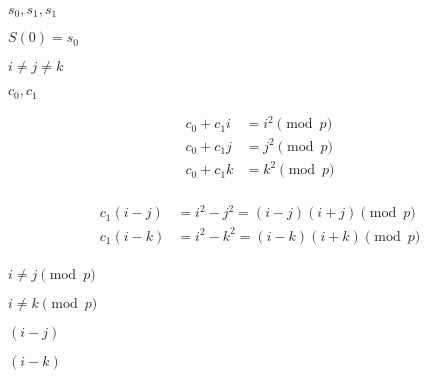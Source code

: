 \documentclass[10pt]{book}
\begin{document}
\begin{mdSnippets}
\begin{mdInlineSnippet}[f7820e082e23e31bc5a25c5e7b5a1c43]%
$s_0,s_1,s_1$\end{mdInlineSnippet}%
\begin{mdInlineSnippet}[a9175ac52b5153759f2c3680d6dde71d]%
$S(0) = s_0$\end{mdInlineSnippet}%
\begin{mdInlineSnippet}[e2f0579d844f263cf2027a9cbadd6466]%
$i \neq j \neq k$\end{mdInlineSnippet}%
\begin{mdInlineSnippet}%
$c_0,c_1$\end{mdInlineSnippet}%
\begin{mdDisplaySnippet}%
\[%
\begin{aligned}
c_0 + c_1 i &= i^2 \pmod{p} \\
c_0 + c_1 j &= j^2 \pmod{p} \\
c_0 + c_1 k &= k^2 \pmod{p} \\
\end{aligned}
\]%
\end{mdDisplaySnippet}%
\begin{mdDisplaySnippet}[85f8524e2980c0cd498647470d5ffd8f]%
\[%
\begin{aligned}
c_1 (i-j) &= i^2 - j^2 = (i-j)(i+j) \pmod{p}\\
c_1 (i-k) &= i^2 - k^2 = (i-k)(i+k)\pmod{p}\\
\end{aligned}
\]%
\end{mdDisplaySnippet}%
\begin{mdInlineSnippet}%
$i \neq j \pmod p$\end{mdInlineSnippet}%
\begin{mdInlineSnippet}[b073924ff62e06c3596742ee601da13f]%
$i \neq k \pmod p$\end{mdInlineSnippet}%
\begin{mdInlineSnippet}[19c879add6af377394c7b455ff5a2025]%
$(i-j)$\end{mdInlineSnippet}%
\begin{mdInlineSnippet}[7d2d0445faaaece6bc70b144cf19cd03]%
$(i-k)$\end{mdInlineSnippet}%

\end{mdSnippets}
\end{document}
